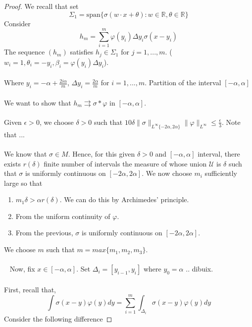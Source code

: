 \documentclass[../main.tex]{subfiles}
\begin{document}
	\begin{proof} %
		We recall that set 
		\begin{equation}
			\Sigma_1 = \text{span} \{ {\sigma(w\cdot x + \theta) : w\in \mathbb{R}, \theta \in \mathbb{R} \} } 
			\tag{1}
		\end{equation}
		Consider $$h_m= \sum_{i=1}^m\varphi(y_i)\Delta y_i \sigma(x-y_i)$$ 
		The sequence $(h_m)$ satisfies $h_j\in \Sigma_1$ for $j=1,...,m$. ($w_i=1,\theta_i=-y_i, \beta_i=\varphi(y_i)\Delta y_i$).\\ \\ 
		Where $y_i=-\alpha + \frac{2i\alpha}{m}$, $\Delta y_i=\frac{2\alpha}{m}$ for $i=1,...,m$. Partition of the interval $[-\alpha,\alpha]$ \\ \\ We want to show that $h_m \rightrightarrows \sigma \ast \varphi $ in $[-\alpha,\alpha]$.  \\ \\
		Given $\epsilon >0$, we choose $\delta >0$ such that $10\delta \| \sigma\|_{L^\infty\{-2\alpha,2\alpha\}}\|\varphi \|_{L^\infty} \leq \frac{\epsilon}{3}$. Note that ... \\ \\ 
		We know that $\sigma \in M$. Hence, for this given $\delta>0$ and $[-\alpha,\alpha]$ interval, there exists $r(\delta)$ finite number of intervals the measure of whose union $\mathscr{U}$ is $\delta$ such that $\sigma$ is uniformly continuous on $[-2\alpha,2\alpha]$. We now choose $m_i$ sufficiently large so that
		\begin{enumerate}
			\item $m_1 \delta > \alpha r(\delta)$. We can do this by Archimedes' principle.
			\item From the uniform continuity of $\varphi$.
			\item From the previous, $\sigma$ is uniformly continuous on  $[-2\alpha,2\alpha]$. 
		\end{enumerate}
		We choose $m$ such that $m=max\{m_1,m_2,m_3\}$. \\ \\ 
		Now, fix $x\in [-\alpha,\alpha] $. Set $\Delta_i= [y_{i-1},y_i]$ where $y_0= \alpha$ .. dibuix. \\ \\
		First, recall that,\\
		$$\int \sigma(x-y)\varphi(y)dy = \sum_{i=1}^m \int_{\Delta_i}\sigma(x-y)\varphi(y)dy$$
		Consider the following difference 


\end{proof}
\end{document}
